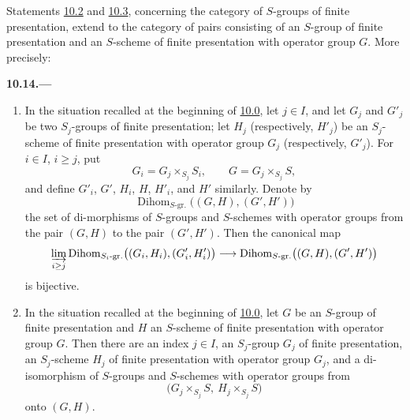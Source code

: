 
\medskip
Statements \hyperref[lem:sga3-VIB-10.2]{10.2} and
\hyperref[lem:sga3-VIB-10.3]{10.3}, concerning the category
of \(S\)-groups of finite presentation, extend to the category
of pairs consisting of an \(S\)-group of finite presentation
and an \(S\)-scheme of finite presentation with operator group
\(G\). More precisely:

\medskip
{}\label{par:sga3-VIB-10.14}%
\noindent\textbf{10.14.---}
\begin{enumerate}
\item[\textup{(i)}]\label{concl:sga3-VIB-10.14-i}
  In the situation recalled at the beginning of
  \hyperref[par:sga3-VIB-10.0]{10.0}, let \(j\in I\), and let \(G_j\) and \(G'_j\) be two
  \(S_j\)-groups of finite presentation; let \(H_j\)
  \textup{(respectively, \(H'_j\))} be an \(S_j\)-scheme of
  finite presentation with operator group \(G_j\)
  \textup{(respectively, \(G'_j\))}. For \(i\in I\),
  \(i\geq j\), put
  \[
    G_i=G_j\times_{S_j}S_i,
    \qquad
    G=G_j\times_{S_j}S,
  \]
  and define \(G'_i\), \(G'\), \(H_i\), \(H\), \(H'_i\),
  and \(H'\) similarly. Denote by
  \[
    \operatorname{Dihom}_{S\text{-}\mathrm{gr.}}
      \bigl((G,H),(G',H')\bigr)
  \]
  the set of di-morphisms of \(S\)-groups and \(S\)-schemes
  with operator groups from the pair \((G,H)\) to the pair
  \((G',H')\). Then the canonical map
  \label{form:sga3-VIB-10.14-Dihom-limit}%
  \[
    \varinjlim_{i\geq j}
      \operatorname{Dihom}_{S_i\text{-}\mathrm{gr.}}
        \bigl((G_i,H_i),(G'_i,H'_i)\bigr)
      \longrightarrow
      \operatorname{Dihom}_{S\text{-}\mathrm{gr.}}
        \bigl((G,H),(G',H')\bigr)
  \]
  is bijective.

\item[\textup{(ii)}]\label{concl:sga3-VIB-10.14-ii}
  In the situation recalled at the beginning of
  \hyperref[par:sga3-VIB-10.0]{10.0}, let \(G\) be an \(S\)-group of finite presentation and
  \(H\) an \(S\)-scheme of finite presentation with operator
  group \(G\). Then there are an index \(j\in I\), an
  \(S_j\)-group \(G_j\) of finite presentation, an
  \(S_j\)-scheme \(H_j\) of finite presentation with operator
  group \(G_j\), and a di-isomorphism of \(S\)-groups and
  \(S\)-schemes with operator groups from
  \[
    \bigl(G_j\times_{S_j}S,\ H_j\times_{S_j}S\bigr)
  \]
  onto \((G,H)\).
\end{enumerate}

